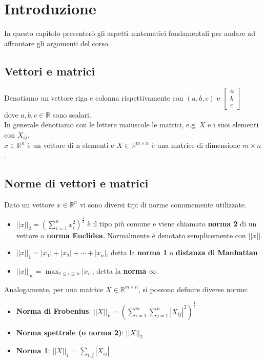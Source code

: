 \chapter{Introduzione}
In questo capitolo presenterò gli aspetti matematici fondamentali per andare ad affrontare gli argomenti del corso.
\\
\section{Vettori e matrici}
Denotiamo un vettore riga e colonna rispettivamente con $(a,b,c)$ e $ \begin{bmatrix} a \\ b \\ c \end{bmatrix} $
\\dove $a,b,c\in\mathbb{R}$ sono scalari.
\\
In generale denotiamo con le lettere maiuscole le matrici, e.g. $X$ e i suoi elementi con $X_{ij}$.\\
$x\in \mathbb{R}^n$ è un vettore di n elementi e $X \in \mathbb{R}^{m \times n}$ è una matrice di dimensione $m \times n$.
\section{Norme di vettori e matrici}
Dato un vettore $x\in \mathbb{R}^n$ vi sono diversi tipi di norme comunemente utilizzate.
\begin{itemize}
	\item $||x||_2=(\sum_{i=1}^n x_i^2)^{\frac{1}{2}}$
	è il tipo più comune e viene chiamato \textbf{norma 2} di un vettore o \textbf{norma Euclidea}. Normalmente è denotato semplicemente con $||x||$.
	\item $||x||_1=|x_1|+|x_2|+\cdots+|x_n|$, detta la \textbf{norma 1} o \textbf{distanza di Manhattan}
	\item $||x||_\infty=\max_{1\leq i\leq n}|x_i|$, detta la \textbf{norma $\infty$}.
\end{itemize}
Analogamente, per una matrice $X \in \mathbb{R}^{m \times n}$, si possono definire diverse norme:

\begin{itemize}
	\item \textbf{Norma di Frobenius}: $||X||_F = \left( \sum_{i=1}^m \sum_{j=1}^n |X_{ij}|^2 \right)^{\frac{1}{2}}$
	\item \textbf{Norma spettrale (o norma 2)}: $||X||_2$
	\item \textbf{Norma 1}: $||X||_1=\sum_{i,j} |X_{ij}|$
\end{itemize}
